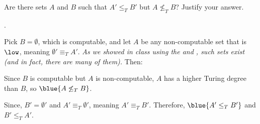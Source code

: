 \begin{problem}
  Are there sets $A$ and $B$ such that $A' \leq_T B'$
  but $A \not\leq_T B$?
  Justify your answer.

  \begin{answer}
    .

    Pick $B = \emptyset$, which is computable,
    and let $A$ be any non-computable set that is $\low$,
    meaning $\emptyset' \equiv_T A'$.
    \emph{
      As we showed in class using
      the  and ,
      such sets exist (and in fact, there are many of them).
    }
    Then:
    \begin{enumarabic}
      \item Since $B$ is computable but $A$ is non-computable, \newline
        $A$ has a higher Turing degree than $B$, so
        $\blue{A \not\leq_T B}$.
      \item Since, $B' = \emptyset'$ and $A' \equiv_T \emptyset'$,
        meaning $A' \equiv_T B'$.
        Therefore, $\blue{A' \leq_T B'}$ and $B' \leq_T A'$.
    \end{enumarabic}
  \end{answer}
\end{problem}
